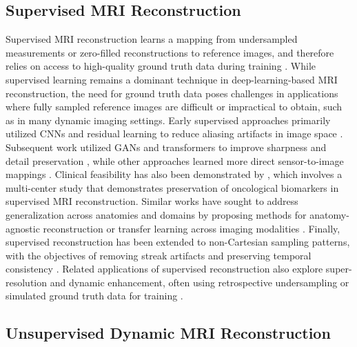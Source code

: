 \documentclass[runningheads]{llncs}
\begin{document}
\subsection{Supervised MRI Reconstruction}

Supervised MRI reconstruction learns a mapping from undersampled measurements or zero-filled reconstructions to reference images, and therefore relies on access to high-quality ground truth data during training \cite{Hossain2024DeepLearningMRI,Singh2023FastMRIReview,Heckel2024DeepLearningMRI}. While supervised learning remains a dominant technique in deep-learning-based MRI reconstruction, the need for ground truth data poses challenges in applications where fully sampled reference images are difficult or impractical to obtain, such as in many dynamic imaging settings. Early supervised approaches primarily utilized CNNs and residual learning to reduce aliasing artifacts in image space \cite{Hyun2018DeepLearningMRI,CHATTERJEE2022105321}. Subsequent work utilized GANs and transformers to improve sharpness and detail preservation \cite{LIU202277,Huang2022EdgeEnhancedFastMRI,NOOR2024106218,HUANG2022281}, while other approaches learned more direct sensor-to-image mappings \cite{Zhu2018DomainTransformMRI}. Clinical feasibility has also been demonstrated by \cite{Rastogi2024DeepLearningMRI}, which involves a multi-center study that demonstrates preservation of oncological biomarkers in supervised MRI reconstruction. Similar works have sought to address generalization across anatomies and domains by proposing methods for anatomy-agnostic reconstruction \cite{10.1007/978-3-030-87231-1_21} or transfer learning across imaging modalities \cite{Han2018DomainAdaptationMRI}. Finally, supervised reconstruction has been extended to non-Cartesian sampling patterns, with the objectives of removing streak artifacts and preserving temporal consistency \cite{Hauptmann2018RealtimeCMR,Kofler2019SpatioTemporalMRI,Shen2020PCNNRealtimeMRI,Jafari2022GRASPnetDCE,CHATTERJEE2022105321}. Related applications of supervised reconstruction also explore super-resolution and dynamic enhancement, often using retrospective undersampling or simulated ground truth data for training  \cite{LYU2024103142,SARASAEN2021102196,Chatterjee2024DDoSUNet,10.1007/978-3-030-32251-9_77}. 

\subsection{Unsupervised Dynamic MRI Reconstruction}
\end{document}
